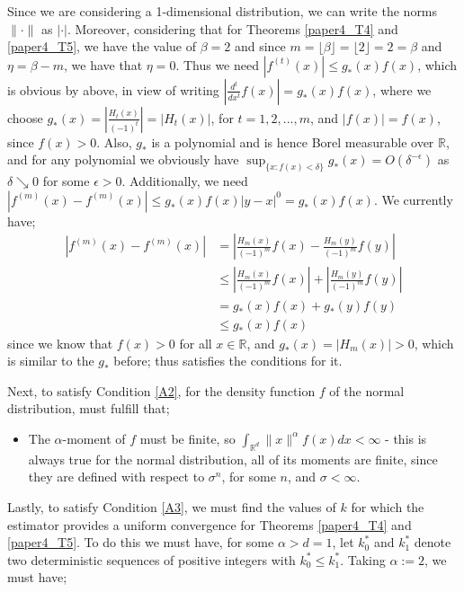\documentclass{article}
\begin{document}
\begin{itemize}
Since we are considering a 1-dimensional distribution, we can write the norms $\| \cdotp \|$ as  $| \cdotp |$. Moreover, considering that for Theorems \ref{paper4_T4} and \ref{paper4_T5}, we have the value of $\beta =2$ and since $m = \lfloor \beta \rfloor =  \lfloor 2 \rfloor = 2 = \beta$ and $\eta = \beta -m$, we have that $\eta =0$. Thus we need  $|f^{(t)}(x)| \leq g_{*}(x) f(x)$, which is obvious by above, in view of writing $|\frac{d^t}{dx^t} f(x)| = g_{*}(x) f(x)$, where we choose $ g_{*}(x) = |\frac{H_{t}(x)}{(-1)^t}| = |H_{t}(x)|$, for $t=1,2,...,m$, and $|f(x)| = f(x)$, since $f(x) >0$. Also, $g_{*}$ is a polynomial and is hence Borel measurable over $\mathbb{R}$, and for any polynomial we obviously have $\sup_{\{x : f(x) < \delta\}} g_{*}(x) = O(\delta^{-\epsilon})$ as $\delta \searrow 0$ for some $\epsilon >0$. Additionally, we need $|f^{(m)}(x) - f^{(m)}(x)| \leq g_{*}(x) f(x)|y - x|^{0} = g_{*}(x) f(x)$. We currently have;
\begin{align*}
|f^{(m)}(x) - f^{(m)}(x)| &= \left| \frac{H_{m}(x)}{(-1)^m} f(x) - \frac{H_{m}(y)}{(-1)^m} f(y) \right| \\
&\leq \left| \frac{H_{m}(x)}{(-1)^m} f(x) \right| + \left| \frac{H_{m}(y)}{(-1)^m} f(y) \right| \\
&= g_{*}(x)f(x) + g_{*}(y)f(y) \\
&\leq g_{*}(x)f(x)
\end{align*}
since we know that $f(x) >0$ for all $x \in \mathbb{R}$, and $g_{*}(x) = |H_{m}(x)| >0$, which is similar to the $g_{*}$ before; thus satisfies the conditions for it.
\end{itemize}

Next, to satisfy Condition \ref{A2}, for the density function $f$ of the normal distribution, must fulfill that;
\begin{itemize}
\item The $\alpha$-moment of $f$ must be finite, so $\int_{\mathbb{R}^{d}} \| x \|^{\alpha} f(x) dx < \infty$ - this is always true for the normal distribution, all of its moments are finite, since they are defined with respect to $\sigma^n$, for some $n$, and $\sigma < \infty$.

\end{itemize}

Lastly, to satisfy Condition \ref{A3}, we must find the values of $k$ for which the estimator provides a uniform convergence for Theorems \ref{paper4_T4} and \ref{paper4_T5}. To do this we must have, for some $\alpha > d = 1$, let $k_{0}^{*}$ and $k_{1}^{*}$ denote two deterministic sequences of positive integers with $k_{0}^{*} \leq k_{1}^{*}$. Taking $\alpha := 2$, we must have;
\end{document}
